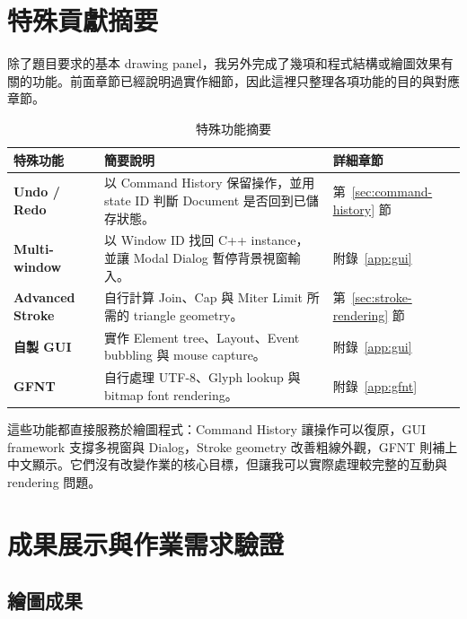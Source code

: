 \section{特殊貢獻摘要}

除了題目要求的基本 drawing panel，我另外完成了幾項和程式結構或繪圖效果有關的功能。前面章節已經說明過實作細節，因此這裡只整理各項功能的目的與對應章節。

\begin{table}[H]
    \centering
    \caption{特殊功能摘要}
    \label{tab:contribution-summary}
    \begin{tabularx}{\textwidth}{>{\bfseries}l X l}
        \toprule
        特殊功能            & 簡要說明                                                      & 詳細章節                           \\
        \midrule
        Undo / Redo     & 以 Command History 保留操作，並用 state ID 判斷 Document 是否回到已儲存狀態。 & 第~\ref{sec:command-history} 節  \\
        Multi-window    & 以 Window ID 找回 C++ instance，並讓 Modal Dialog 暫停背景視窗輸入。     & 附錄~\ref{app:gui}               \\
        Advanced Stroke & 自行計算 Join、Cap 與 Miter Limit 所需的 triangle geometry。        & 第~\ref{sec:stroke-rendering} 節 \\
        自製 GUI          & 實作 Element tree、Layout、Event bubbling 與 mouse capture。    & 附錄~\ref{app:gui}               \\
        GFNT            & 自行處理 UTF-8、Glyph lookup 與 bitmap font rendering。          & 附錄~\ref{app:gfnt}              \\
        \bottomrule
    \end{tabularx}
\end{table}

這些功能都直接服務於繪圖程式：Command History 讓操作可以復原，GUI framework 支撐多視窗與 Dialog，Stroke geometry 改善粗線外觀，GFNT 則補上中文顯示。它們沒有改變作業的核心目標，但讓我可以實際處理較完整的互動與 rendering 問題。

\section{成果展示與作業需求驗證}

\subsection{繪圖成果}

